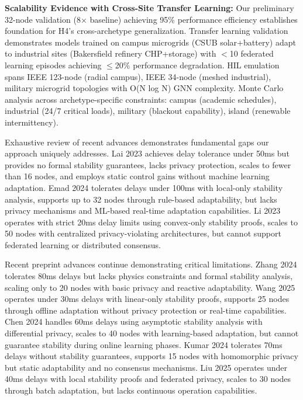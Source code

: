 \documentclass[12pt]{article}
\begin{document}
\textbf{Scalability Evidence with Cross-Site Transfer Learning:} Our preliminary 32-node validation (8× baseline) achieving 95\% performance efficiency establishes foundation for H4's cross-archetype generalization. Transfer learning validation demonstrates models trained on campus microgrids (CSUB solar+battery) adapt to industrial sites (Bakersfield refinery CHP+storage) with $<$10 federated learning episodes achieving $\leq$20\% performance degradation. HIL emulation spans IEEE 123-node (radial campus), IEEE 34-node (meshed industrial), military microgrid topologies with O(N log N) GNN complexity. Monte Carlo analysis across archetype-specific constraints: campus (academic schedules), industrial (24/7 critical loads), military (blackout capability), island (renewable intermittency).

Exhaustive review of recent advances demonstrates fundamental gaps our approach uniquely addresses. Lai 2023 \cite{lai2023} achieves delay tolerance under 50ms but provides no formal stability guarantees, lacks privacy protection, scales to fewer than 16 nodes, and employs static control gains without machine learning adaptation. Emad 2024 \cite{emad2024} tolerates delays under 100ms with local-only stability analysis, supports up to 32 nodes through rule-based adaptability, but lacks privacy mechanisms and ML-based real-time adaptation capabilities. Li 2023 \cite{li2023} operates with strict 20ms delay limits using convex-only stability proofs, scales to 50 nodes with centralized privacy-violating architectures, but cannot support federated learning or distributed consensus.

Recent preprint advances continue demonstrating critical limitations. Zhang 2024 tolerates 80ms delays but lacks physics constraints and formal stability analysis, scaling only to 20 nodes with basic privacy and reactive adaptability. Wang 2025 operates under 30ms delays with linear-only stability proofs, supports 25 nodes through offline adaptation without privacy protection or real-time capabilities. Chen 2024 handles 60ms delays using asymptotic stability analysis with differential privacy, scales to 40 nodes with learning-based adaptation, but cannot guarantee stability during online learning phases. Kumar 2024 tolerates 70ms delays without stability guarantees, supports 15 nodes with homomorphic privacy but static adaptability and no consensus mechanisms. Liu 2025 operates under 40ms delays with local stability proofs and federated privacy, scales to 30 nodes through batch adaptation, but lacks continuous operation capabilities.
\end{document}
